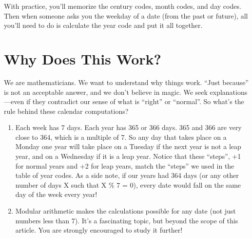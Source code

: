 \documentclass{article}
\begin{document}
    With practice, you'll memorize the century codes, month codes, and day codes. 
    Then when someone asks you the weekday of a date (from the past or future), 
    all you'll need to do is calculate the year code and put it all together.

    \begin{center}
    \end{center}

\newpage

  \section{Why Does This Work?}
  We are mathematicians. We want to understand why things work. 
  “Just because” is not an acceptable answer, and we don't believe in magic. 
  We seek explanations—even if they contradict our sense of what is “right” or “normal”. 
  So what's the rule behind these calendar computations?
  \begin{enumerate}
    \item Each week has 7 days. Each year has 365 or 366 days. 
          365 and 366 are very close to 364, which is a multiple of 7. 
          So any day that takes place on a Monday one year will take place on a Tuesday 
          if the next year is not a leap year, and on a Wednesday if it is a leap year. 
          Notice that these “steps”, +1 for normal years and +2 for leap years, 
          match the “steps” we used in the table of year codes.
          As a side note, if our years had 364 days 
          (or any other number of days X such that X \% 7 = 0), 
          every date would fall on the same day of the week every year!
    \item Modular arithmetic makes the calculations possible for any date 
          (not just numbers less than 7). 
          It's a fascinating topic, but beyond the scope of this article. You are 
          strongly encouraged to study it further!
  \end{enumerate}
\end{document}
